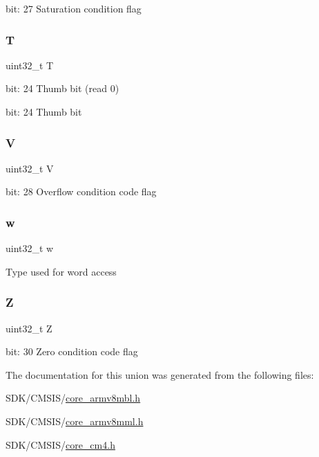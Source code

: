 bit\+: 27 Saturation condition flag \mbox{\label{unionx_p_s_r___type_a6e1cf12e53a20224f6f62c001d9be972}} 
\subsubsection{\texorpdfstring{T}{T}}
{\footnotesize\ttfamily uint32\+\_\+t T}

bit\+: 24 Thumb bit (read 0)

bit\+: 24 Thumb bit \mbox{\label{unionx_p_s_r___type_acd4a2b64faee91e4a9eef300667fa222}} 
\subsubsection{\texorpdfstring{V}{V}}
{\footnotesize\ttfamily uint32\+\_\+t V}

bit\+: 28 Overflow condition code flag \mbox{\label{unionx_p_s_r___type_ad0fb62e7a08e70fc5e0a76b67809f84b}} 
\subsubsection{\texorpdfstring{w}{w}}
{\footnotesize\ttfamily uint32\+\_\+t w}

Type used for word access \mbox{\label{unionx_p_s_r___type_a5ae954cbd9986cd64625d7fa00943c8e}} 
\subsubsection{\texorpdfstring{Z}{Z}}
{\footnotesize\ttfamily uint32\+\_\+t Z}

bit\+: 30 Zero condition code flag 

The documentation for this union was generated from the following files\+:\begin{DoxyCompactItemize}
\item 
S\+D\+K/\+C\+M\+S\+I\+S/\mbox{\hyperlink{core__armv8mbl_8h}{core\+\_\+armv8mbl.\+h}}\item 
S\+D\+K/\+C\+M\+S\+I\+S/\mbox{\hyperlink{core__armv8mml_8h}{core\+\_\+armv8mml.\+h}}\item 
S\+D\+K/\+C\+M\+S\+I\+S/\mbox{\hyperlink{core__cm4_8h}{core\+\_\+cm4.\+h}}\end{DoxyCompactItemize}
